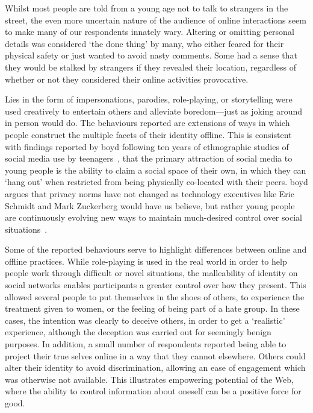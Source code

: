 \documentclass{sig-alternate}
\begin{document}
Whilst most people are told from a young age not to talk to strangers in the street, the even more uncertain nature of the audience of online interactions seem to make many of our respondents innately wary. Altering or omitting personal details was considered `the done thing' by many, who either feared for their physical safety or just wanted to avoid nasty comments. Some had a sense that they would be stalked by strangers if they revealed their location, regardless of whether or not they considered their online activities provocative.

Lies in the form of impersonations, parodies, role-playing, or storytelling were used creatively to entertain others and alleviate boredom---just as joking around in person would do. The behaviours reported are extensions of ways in which people construct the multiple facets of their identity offline.  This is consistent with findings reported by boyd following ten years of ethnographic studies of social media use by teenagers~\cite{boyd2014}, that the primary attraction of social media to young people is the ability to claim a social space of their own, in which they can `hang out' when restricted from being physically co-located with their peers. boyd argues that privacy norms have not changed as technology executives like Eric Schmidt and Mark Zuckerberg would have us believe, but rather young people are continuously evolving new ways to maintain much-desired control over social situations~\cite{boyd2014, guardian}.

Some of the reported behaviours serve to highlight differences between online and offline practices. While role-playing is used in the real world in order to help people work through difficult or novel situations, the malleability of identity on social networks enables participants a greater control over how they present. This allowed several people to put themselves in the shoes of others, to experience the treatment given to women, or the feeling of being part of a hate group. In these cases, the intention  was clearly to deceive others, in order to get a `realistic' experience, although the deception was carried out for seemingly benign purposes. In addition, a small number of respondents reported being able to project their true selves online in a way that they cannot elsewhere. Others could alter their identity to avoid discrimination, allowing an ease of engagement which was otherwise not available. This illustrates empowering potential of the Web, where the ability to control information about oneself can be a positive force for good.
\end{document}
